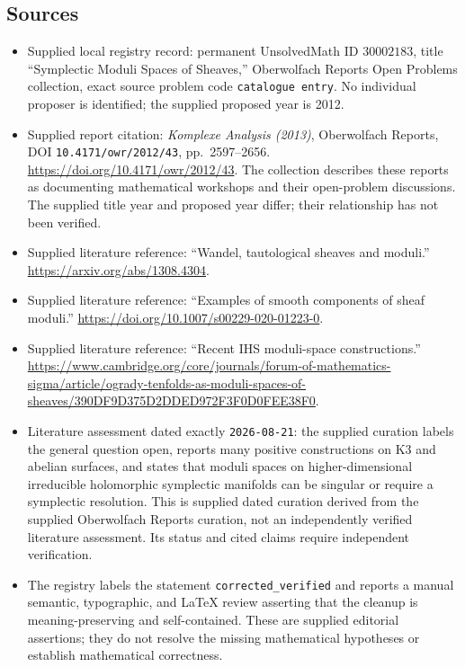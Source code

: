 \documentclass[11pt]{article}
\begin{document}
\subsection{Sources}
\begin{itemize}
\item Supplied local registry record: permanent UnsolvedMath ID \(30002183\), title ``Symplectic Moduli Spaces of Sheaves,'' Oberwolfach Reports Open Problems collection, exact source problem code \texttt{catalogue entry}. No individual proposer is identified; the supplied proposed year is 2012.
\item Supplied report citation: \emph{Komplexe Analysis (2013)}, Oberwolfach Reports, DOI \texttt{10.4171/owr/2012/43}, pp.\ 2597--2656. \url{https://doi.org/10.4171/owr/2012/43}. The collection describes these reports as documenting mathematical workshops and their open-problem discussions. The supplied title year and proposed year differ; their relationship has not been verified.
\item Supplied literature reference: ``Wandel, tautological sheaves and moduli.'' \url{https://arxiv.org/abs/1308.4304}.
\item Supplied literature reference: ``Examples of smooth components of sheaf moduli.'' \url{https://doi.org/10.1007/s00229-020-01223-0}.
\item Supplied literature reference: ``Recent IHS moduli-space constructions.'' \url{https://www.cambridge.org/core/journals/forum-of-mathematics-sigma/article/ogrady-tenfolds-as-moduli-spaces-of-sheaves/390DF9D375D2DDED972F3F0D0FEE38F0}.
\item Literature assessment dated exactly \texttt{2026-08-21}: the supplied curation labels the general question open, reports many positive constructions on K3 and abelian surfaces, and states that moduli spaces on higher-dimensional irreducible holomorphic symplectic manifolds can be singular or require a symplectic resolution. This is supplied dated curation derived from the supplied Oberwolfach Reports curation, not an independently verified literature assessment. Its status and cited claims require independent verification.
\item The registry labels the statement \texttt{corrected\_verified} and reports a manual semantic, typographic, and LaTeX review asserting that the cleanup is meaning-preserving and self-contained. These are supplied editorial assertions; they do not resolve the missing mathematical hypotheses or establish mathematical correctness.
\end{itemize}
\end{document}
